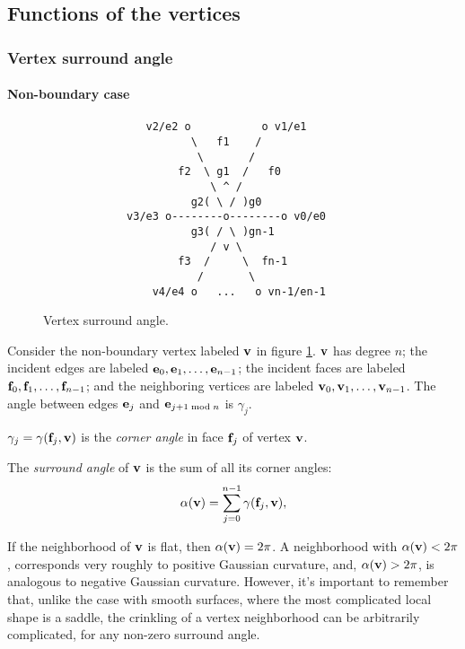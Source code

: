 \subsection{Functions of the vertices}
\label{sec:vertices}


\subsubsection{Vertex surround angle}
\label{sec:vertex_surround_angle}

\paragraph{Non-boundary case}
\label{sec:non_boundary_vertex_surround_angle}

\begin{figure}[!htp]
\centering
\begin{verbatim}
                v2/e2 o           o v1/e1
                       \   f1    /
                        \       /
                     f2  \ g1  /   f0
                          \ ^ /
                       g2( \ / )g0
             v3/e3 o--------o--------o v0/e0
                       g3( / \ )gn-1
                          / v \
                     f3  /     \  fn-1
                        /       \
                 v4/e4 o   ...   o vn-1/en-1
\end{verbatim}
\caption{Vertex surround angle.
\label{fig:vertex_surround_angle}}
\end{figure}

Consider the non-boundary vertex
labeled ${\mathbf v}$ in figure \ref{fig:vertex_surround_angle}.
${\mathbf v}$ has degree $n$;
the incident edges are labeled ${\mathbf e}_0, {\mathbf e}_1, \ldots, {\mathbf e}_{n-1}$;
the incident faces are labeled ${\mathbf f}_0, {\mathbf f}_1, \ldots, {\mathbf f}_{n-1}$;
and the neighboring vertices are labeled ${\mathbf v}_0, {\mathbf v}_1, \ldots, {\mathbf v}_{n-1}$.
The angle between edges ${\mathbf e}_j$ and ${\mathbf e}_{j + 1 \bmod n}$ is $\gamma_j$.

$\gamma_j = \gamma({\mathbf f}_j,{\mathbf v})$ is the {\em corner angle} in face ${\mathbf f}_j$
of vertex ${\mathbf v}$.

The {\em surround angle} of ${\mathbf v}$ is the sum of all its corner angles:
\begin{equation}
\alpha({\mathbf v}) = \sum_{j=0}^{n-1} \gamma({\mathbf f}_j,{\mathbf v}),
\end{equation}

If the neighborhood of ${\mathbf v}$ is flat, then $\alpha({\mathbf v})=2\pi$.
A neighborhood with $\alpha({\mathbf v}) < 2\pi$, corresponds very roughly
to positive Gaussian curvature,
and, $\alpha({\mathbf v}) > 2\pi$,
is analogous to negative Gaussian curvature.
However, it's important to remember that, unlike the case
with smooth surfaces, where the most complicated local
shape is a saddle,
the crinkling of a vertex neighborhood can be arbitrarily complicated,
for any non-zero surround angle.

